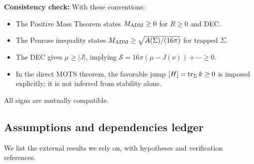 \begin{remark}
\textbf{Consistency check:} With these conventions:
\begin{itemize}
    \item The Positive Mass Theorem states $M_{\mathrm{ADM}} \ge 0$ for $R \ge 0$ and DEC.
    \item The Penrose inequality states $M_{\mathrm{ADM}} \ge \sqrt{A(\Sigma)/(16\pi)}$ for trapped $\Sigma$.
    \item The DEC gives $\mu \ge |J|$, implying $\mathcal{S} = 16\pi(\mu - J(\nu)) + \cdots \ge 0$.
    \item In the direct MOTS theorem, the favorable jump $[H] = \operatorname{tr}_\Sigma k \ge 0$ is imposed explicitly; it is not inferred from stability alone.
\end{itemize}
All signs are mutually compatible.
\end{remark}

\subsection{Assumptions and dependencies ledger}
We list the external results we rely on, with hypotheses and verification references.

